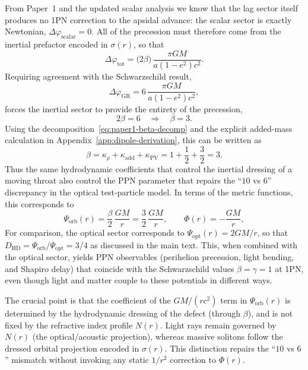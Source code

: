 \documentclass[11pt]{article}
\begin{document}
From Paper~1 and the updated scalar analysis we know that the lag sector
itself produces no 1PN correction to the apsidal advance: the scalar sector
is exactly Newtonian, $\Delta\varphi_{\text{scalar}} = 0$.  All of the
precession must therefore come from the inertial prefactor encoded in
$\sigma(r)$, so that
\begin{equation}
  \Delta\varphi_{\text{tot}}
  = \bigl(2\beta\bigr)\,
    \frac{\pi GM}{a(1-e^2)c^2}.
\end{equation}
Requiring agreement with the Schwarzschild result,
\begin{equation}
  \Delta\varphi_{\text{GR}}
  = 6\,\frac{\pi GM}{a(1-e^2)c^2},
\end{equation}
forces the inertial sector to provide the entirety of the precession,
\begin{equation}
  2\beta = 6
  \quad\Rightarrow\quad
  \beta = 3.
\end{equation}
Using the decomposition~\eqref{eq:paper1-beta-decomp} and the explicit
added-mass calculation in Appendix~\ref{app:dipole-derivation}, this can
be written as
\begin{equation}
  \beta = \kappa_\rho + \kappa_{\mathrm{add}} + \kappa_{\mathrm{PV}}
        = 1 + \frac{1}{2} + \frac{3}{2}
        = 3.
\end{equation}
Thus the same hydrodynamic coefficients that control the inertial
dressing of a moving throat also control the PPN parameter that repairs
the ``$10$ vs $6$'' discrepancy in the optical test-particle model.
In terms of the metric functions, this corresponds to
\begin{equation}
  \Psi_{\mathrm{orb}}(r)
  = \frac{\beta}{2}\,\frac{GM}{r}
  = \frac{3}{2}\,\frac{GM}{r},
  \qquad
  \Phi(r)
  = -\frac{GM}{r},
\end{equation}
For comparison, the optical sector corresponds to
$\Psi_{\mathrm{opt}}(r)=2GM/r$, so that
$D_{\mathrm{HD}}=\Psi_{\mathrm{orb}}/\Psi_{\mathrm{opt}}=3/4$ as discussed
in the main text.
This, when combined with the optical sector, yields PPN observables
(perihelion precession, light bending, and Shapiro delay) that coincide
with the Schwarzschild values $\beta = \gamma = 1$ at 1PN, even though
light and matter couple to these potentials in different ways.

The crucial point is that the coefficient of the $GM/(r c^2)$ term in
$\Psi_{\mathrm{orb}}(r)$ is determined by the hydrodynamic dressing of the
defect (through $\beta$), and is not fixed by the refractive index profile
$N(r)$.  Light rays remain governed by $N(r)$ (the optical/acoustic
projection), whereas massive solitons follow the dressed orbital projection
encoded in $\sigma(r)$.  This distinction repairs the ``$10$ vs $6$''
mismatch without invoking any static $1/r^2$ correction to $\Phi(r)$.
\end{document}
